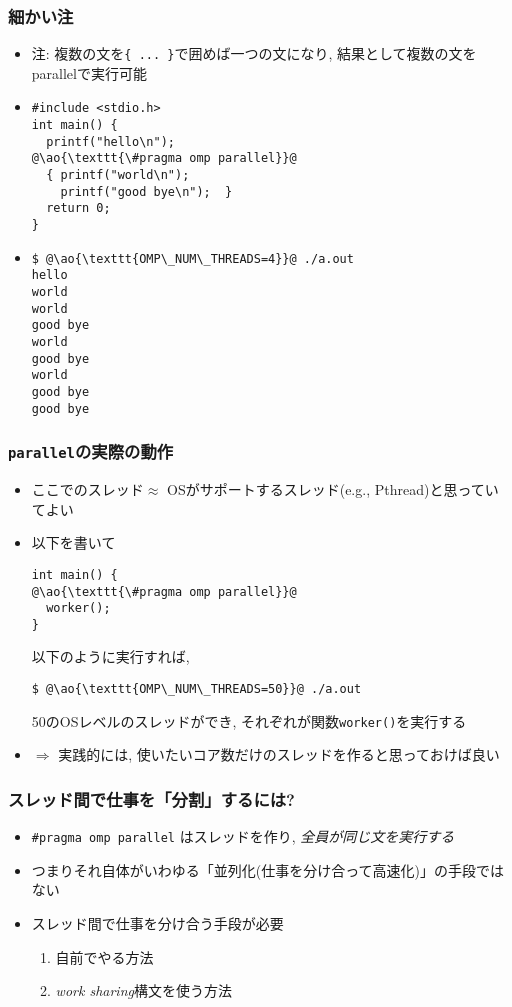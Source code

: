 \documentclass[10pt,dvipdfmx]{beamer}
\newcommand{\ao}[1]{{\color{blue}#1}}
\newcommand{\aka}[1]{{\color{red}#1}}
\begin{document}
\begin{frame}[fragile]
\frametitle{細かい注}

\begin{itemize}
\item 注: 複数の文を\texttt{\{ ... \}}で囲めば一つの文になり,
  結果として複数の文をparallelで実行可能
\item []
\begin{lstlisting}
#include <stdio.h>
int main() {
  printf("hello\n");
@\ao{\texttt{\#pragma omp parallel}}@
  { printf("world\n");
    printf("good bye\n");  }
  return 0;
}
\end{lstlisting}

\item []
\begin{lstlisting}
$ @\ao{\texttt{OMP\_NUM\_THREADS=4}}@ ./a.out
hello
world
world
good bye
world
good bye
world
good bye
good bye
\end{lstlisting} %
\end{itemize}
\end{frame}

\begin{frame}[fragile]
\frametitle{\texttt{parallel}の実際の動作}
\begin{itemize}
\item ここでのスレッド$\approx$ OSがサポートするスレッド(e.g., Pthread)と思っていてよい

\item 以下を書いて
\begin{lstlisting}
int main() {
@\ao{\texttt{\#pragma omp parallel}}@
  worker();
}
\end{lstlisting}
以下のように実行すれば, 
\begin{lstlisting}
$ @\ao{\texttt{OMP\_NUM\_THREADS=50}}@ ./a.out
\end{lstlisting} %
50のOSレベルのスレッドができ, それぞれが関数{\tt worker()}を実行する

\item $\Rightarrow$ 実践的には,
  \ao{使いたいコア数}だけのスレッドを作ると思っておけば良い
\end{itemize}
\end{frame}

\begin{frame}
\frametitle{スレッド間で仕事を「分割」するには?}
\begin{itemize}
\item {\tt \#pragma omp parallel} はスレッドを作り, 
  \aka{\em 全員が同じ文を実行する}
\item つまりそれ自体がいわゆる「並列化(仕事を分け合って高速化)」の手段ではない
\item スレッド間で仕事を分け合う手段が必要
  \begin{enumerate}
  \item 自前でやる方法
  \item \ao{\em work sharing}構文を使う方法
  \end{enumerate}
\end{itemize}
\end{frame}
\end{document}
